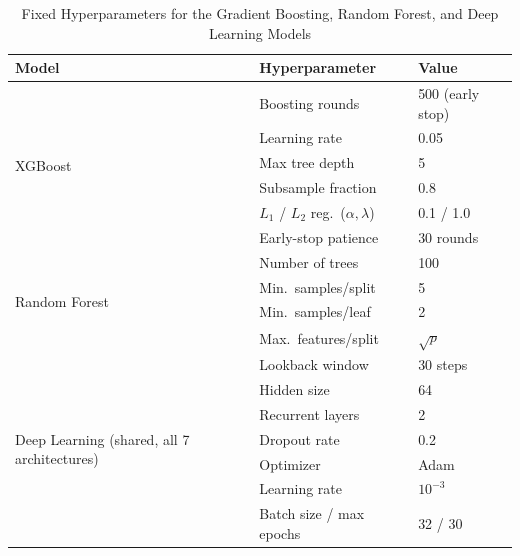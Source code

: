 \begin{table}[!t]
\caption{Fixed Hyperparameters for the Gradient Boosting, Random Forest, and Deep Learning Models}
\label{tab:hyperparameters}
\centering
\begin{tabular}{@{}p{2.6cm}p{2.9cm}p{2.1cm}@{}}
\toprule
\textbf{Model} & \textbf{Hyperparameter} & \textbf{Value} \\
\midrule
\multirow{6}{2.6cm}{XGBoost} & Boosting rounds & 500 (early stop) \\
 & Learning rate & 0.05 \\
 & Max tree depth & 5 \\
 & Subsample fraction & 0.8 \\
 & $L_1$ / $L_2$ reg.\ ($\alpha,\lambda$) & 0.1 / 1.0 \\
 & Early-stop patience & 30 rounds \\
\midrule
\multirow{4}{2.6cm}{Random Forest} & Number of trees & 100 \\
 & Min.\ samples/split & 5 \\
 & Min.\ samples/leaf & 2 \\
 & Max.\ features/split & $\sqrt{p}$ \\
\midrule
\multirow{7}{2.6cm}{Deep Learning (shared, all 7 architectures)} & Lookback window & 30 steps \\
 & Hidden size & 64 \\
 & Recurrent layers & 2 \\
 & Dropout rate & 0.2 \\
 & Optimizer & Adam \\
 & Learning rate & $10^{-3}$ \\
 & Batch size / max epochs & 32 / 30 \\
\bottomrule
\end{tabular}
\end{table}
